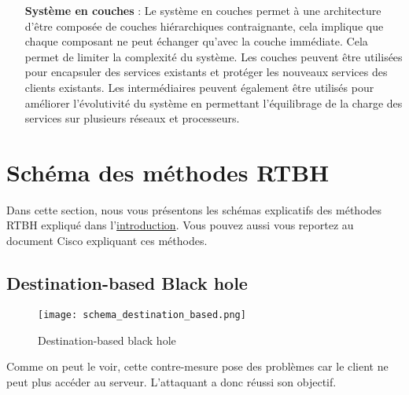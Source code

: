 \begin{itemize}
    \item [\textbf{Système en couches}] :
    \newline
    Le système en couches permet à une architecture d'être composée de couches hiérarchiques contraignante, cela implique que chaque composant ne peut échanger qu'avec la couche immédiate. Cela permet de limiter la complexité du système. Les couches peuvent être utilisées pour encapsuler des services existants et protéger les nouveaux services des clients existants. Les intermédiaires peuvent également être utilisés pour améliorer l'évolutivité du système en permettant l'équilibrage de la charge des services sur plusieurs réseaux et processeurs.\newline
    \newpage

\end{itemize}

\newpage
\section{Schéma des méthodes RTBH}

Dans cette section, nous vous présentons les schémas explicatifs des méthodes RTBH expliqué dans l'\hyperref[sec:intro]{introduction}. Vous pouvez aussi vous reportez au document Cisco expliquant ces méthodes.\cite{Sys05}

\subsection{Destination-based Black hole}

\begin{figure}[H]
    \texttt{[image: schema\_destination\_based.png]}
    \caption{Destination-based black hole}
    \label{fig:destination_based}
\end{figure}

Comme on peut le voir, cette contre-mesure pose des problèmes car le client ne peut plus accéder au serveur. L'attaquant a donc réussi son objectif.

